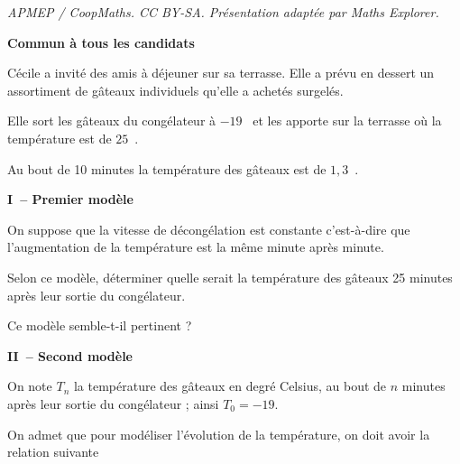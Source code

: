 \documentclass[10pt]{article}
\begin{document}
\noindent\textit{APMEP / CoopMaths. CC BY-SA. Présentation adaptée par Maths Explorer.}\par\medskip
\textbf{Commun à tous les candidats}

\vspace{0.5cm}

Cécile a invité des amis à déjeuner sur sa terrasse. Elle a prévu en dessert 
un assortiment de gâteaux individuels qu'elle a achetés surgelés.

Elle sort les gâteaux du congélateur à $-19$~\textcelsius{} et les apporte sur la terrasse où la température est de  $25$~\textcelsius.

Au bout de 10 minutes la température des gâteaux est de $1,3$~\textcelsius.

\begin{center}
\textbf{I~-- Premier modèle}
\end{center}

On suppose que la vitesse de décongélation est constante c'est-à-dire que l'augmentation de la température est la même minute après minute.

Selon ce modèle, déterminer quelle serait la température des gâteaux 25 minutes après leur sortie du congélateur.

Ce modèle semble-t-il pertinent ? 

\medskip

\begin{center}
\textbf{II~-- Second modèle}
\end{center}
\medskip

On note $T_n$ la température des gâteaux  en degré Celsius, au bout de $n$ minutes après leur sortie du congélateur ; ainsi $T_0 = - 19$.

On admet que pour modéliser l'évolution de la température, on doit avoir la relation suivante 
\end{document}
